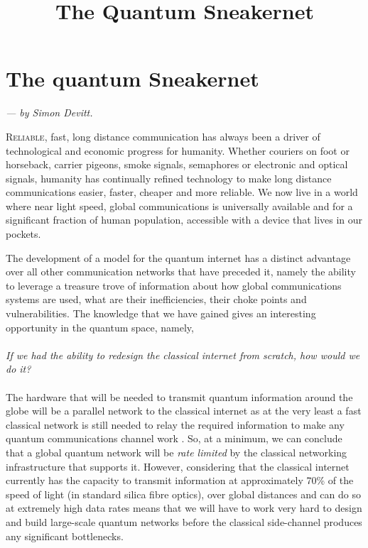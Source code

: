 \documentclass[twocolumn, aps, rmp, amsmath, amssymb, nofootinbib, superscriptaddress, longbibliography, floatfix, table-of-contents, eqsecnum]{revtex4-2}
\newcommand{\sectionby}[1]{\begin{center}\textit{--- by #1.}\end{center}}
\newcommand{\dropcap}[2]{\lettrine[lines=2, findent=3pt, nindent=0pt]{#1}{#2}}
\begin{document}
\title{The Quantum Sneakernet}

\maketitle

\tableofcontents 

\section{The quantum Sneakernet\texttrademark}\label{sec:sneakernet}

\sectionby{Simon Devitt}

\dropcap{R}{eliable}, fast, long distance communication has always been a driver of technological and economic progress for humanity. Whether couriers on foot or horseback, carrier pigeons, smoke signals, semaphores or electronic and optical signals, humanity has continually refined technology to make long distance communications easier, faster, cheaper and more reliable. We now live in a world where near light speed, global communications is universally available and for a significant fraction of human population, accessible with a device that lives in our pockets. 

The development of a model for the quantum internet \cite{?} has a distinct advantage over all other communication networks that have preceded it, namely the ability to leverage a treasure trove of information about how global communications systems are used, what are their inefficiencies, their choke points and vulnerabilities. The knowledge that we have gained gives an interesting opportunity in the quantum space, namely, 
\\
\\
\textit{If we had the ability to redesign the classical internet from scratch, how would we do it?}
\\
\\
The hardware that will be needed to transmit quantum information around the globe will be a parallel network to the classical internet as at the very least a fast classical network is still needed to relay the required information to make any quantum communications channel work \cite{?}. So, at a minimum, we can conclude that a global quantum network will be \textit{rate limited} by the classical networking infrastructure that supports it. However, considering that the classical internet currently has the capacity to transmit information at approximately 70\% of the speed of light (in standard silica fibre optics), over global distances and can do so at extremely high data rates means that we will have to work very hard to design and build large-scale quantum networks before the classical side-channel produces any significant bottlenecks. 
\end{document}
